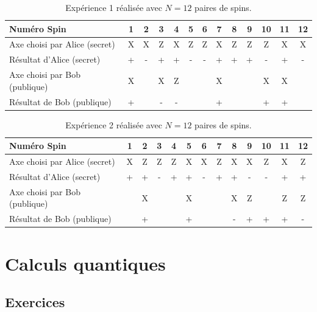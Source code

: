 \begin{table}[htp]
\centering
\begin{tabular}{|l|c|c|c|c|c|c|c|c|c|c|c|c|}\hline
Numéro Spin & 1 &\cellcolor[gray]{.8} 2 & 3 & 4 &\cellcolor[gray]{.8} 5
&\cellcolor[gray]{.8} 6 & 7 &\cellcolor[gray]{.8} 8 &\cellcolor[gray]{.8} 9 & 10
& 11 &\cellcolor[gray]{.8} 12\\\hline
Axe  choisi par Alice (secret) & X &\cellcolor[gray]{.8} X & Z & X
&\cellcolor[gray]{.8} Z &\cellcolor[gray]{.8} Z & X &\cellcolor[gray]{.8} Z
&\cellcolor[gray]{.8} Z & Z & X &\cellcolor[gray]{.8}
X\\\hline
Résultat d'Alice (secret) & + &\cellcolor[gray]{.8} - & + & +
&\cellcolor[gray]{.8} - &\cellcolor[gray]{.8} - & + &\cellcolor[gray]{.8} +
&\cellcolor[gray]{.8} + & - & + &\cellcolor[gray]{.8}
-\\\hline
Axe choisi par Bob (publique) & X &  & X & Z &  &  & X &  &  & X & X &
\\\hline
Résultat de Bob (publique) & + &  & - & - &  &  & + &  &  & + & + & \\\hline
\end{tabular}
\caption{\small Expérience 1 réalisée avec $N=12$ paires de spins.}
\label{tab:Exp1}
\end{table}

\begin{table}[htp]
\centering
\begin{tabular}{|l|c|c|c|c|c|c|c|c|c|c|c|c|}\hline
Numéro Spin & 1 & 2 & 3 & 4 & 5 & 6 & 7 & 8 & 9 & 10 & 11 &  12\\\hline
Axe  choisi par Alice (secret) & X & Z & Z & Z & X & X & Z & X & X & Z & X &
Z\\\hline
Résultat d'Alice (secret) & + & + & - & + & + & - & + & + & - & - & + &
+\\\hline
Axe choisi par Bob (publique) &  & X &  &  & X &  &  & X & Z &  & Z & Z\\\hline
Résultat de Bob (publique) &  &  +&  &  & + &  & & - & + & +& + & -\\\hline
\end{tabular}
\caption{\small Expérience 2 réalisée avec $N=12$ paires de spins.}
\label{tab:Exp2}
\end{table}


\section{Calculs quantiques}

\subsection{Exercices}

